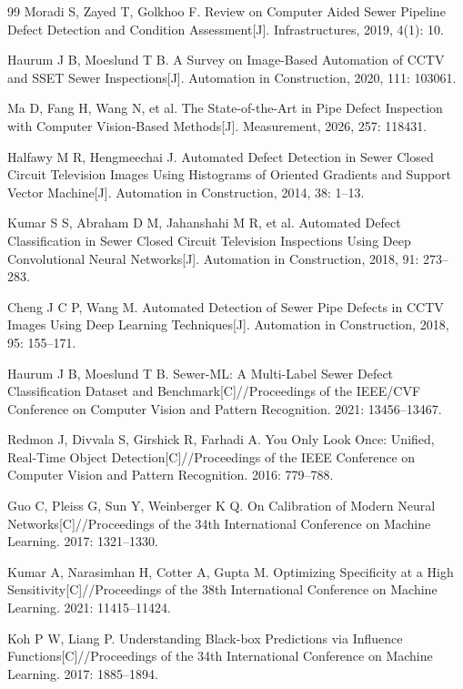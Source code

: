 \documentclass[UTF8,openany,12pt]{ctexbook}
\begin{document}
\backmatter
\begin{thebibliography}{99}
Moradi S, Zayed T, Golkhoo F. Review on Computer Aided Sewer Pipeline Defect Detection and Condition Assessment[J]. Infrastructures, 2019, 4(1): 10.

Haurum J B, Moeslund T B. A Survey on Image-Based Automation of CCTV and SSET Sewer Inspections[J]. Automation in Construction, 2020, 111: 103061.

Ma D, Fang H, Wang N, et al. The State-of-the-Art in Pipe Defect Inspection with Computer Vision-Based Methods[J]. Measurement, 2026, 257: 118431.

Halfawy M R, Hengmeechai J. Automated Defect Detection in Sewer Closed Circuit Television Images Using Histograms of Oriented Gradients and Support Vector Machine[J]. Automation in Construction, 2014, 38: 1--13.

Kumar S S, Abraham D M, Jahanshahi M R, et al. Automated Defect Classification in Sewer Closed Circuit Television Inspections Using Deep Convolutional Neural Networks[J]. Automation in Construction, 2018, 91: 273--283.

Cheng J C P, Wang M. Automated Detection of Sewer Pipe Defects in CCTV Images Using Deep Learning Techniques[J]. Automation in Construction, 2018, 95: 155--171.

Haurum J B, Moeslund T B. Sewer-ML: A Multi-Label Sewer Defect Classification Dataset and Benchmark[C]//Proceedings of the IEEE/CVF Conference on Computer Vision and Pattern Recognition. 2021: 13456--13467.

Redmon J, Divvala S, Girshick R, Farhadi A. You Only Look Once: Unified, Real-Time Object Detection[C]//Proceedings of the IEEE Conference on Computer Vision and Pattern Recognition. 2016: 779--788.

Guo C, Pleiss G, Sun Y, Weinberger K Q. On Calibration of Modern Neural Networks[C]//Proceedings of the 34th International Conference on Machine Learning. 2017: 1321--1330.

Kumar A, Narasimhan H, Cotter A, Gupta M. Optimizing Specificity at a High Sensitivity[C]//Proceedings of the 38th International Conference on Machine Learning. 2021: 11415--11424.

Koh P W, Liang P. Understanding Black-box Predictions via Influence Functions[C]//Proceedings of the 34th International Conference on Machine Learning. 2017: 1885--1894.


\end{thebibliography}
\end{document}
